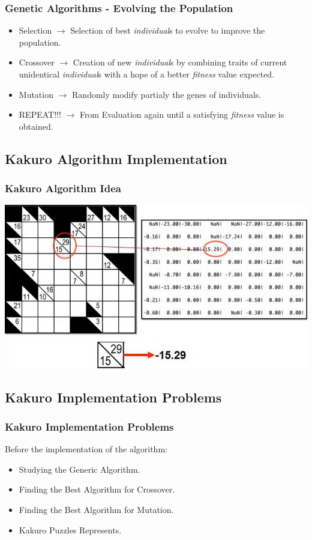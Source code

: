 \documentclass{beamer}
\begin{document}
			\begin{frame}
				\frametitle{Genetic Algorithms - Evolving the Population}
				\begin{itemize} [<+->]
					\item Selection $\rightarrow$ Selection of best {\it individual}s to evolve to improve the population.
					\item Crossover $\rightarrow$ Creation of new {\it individual}s by combining traits of current unidentical {\it individual}s  with a hope of a better {\it fitness} value expected.
					\item Mutation $\rightarrow$ Randomly modify partialy the genes of individuals.
					\item REPEAT!!! $\rightarrow$ From Evaluation again until a satisfying {\it fitness} value is obtained.
				\end{itemize} 
			\end{frame}

		\subsection{Kakuro Algorithm Implementation}
			\begin{frame}
				\frametitle{Kakuro Algorithm Idea}
				\includegraphics[scale=0.48]{KakuroImpl} 
			\end{frame}

		\subsection{Kakuro Implementation Problems}
			\begin{frame}
				\frametitle{Kakuro Implementation Problems}
				Before the implementation of the algorithm:
				\begin{itemize} [<+->]
					\item Studying the Generic Algorithm.
					\item Finding the Best Algorithm for Crossover.
					\item Finding the Best Algorithm for Mutation.
					\item Kakuro Puzzles Represents.
				\end{itemize}
			\end{frame}
\end{document}
